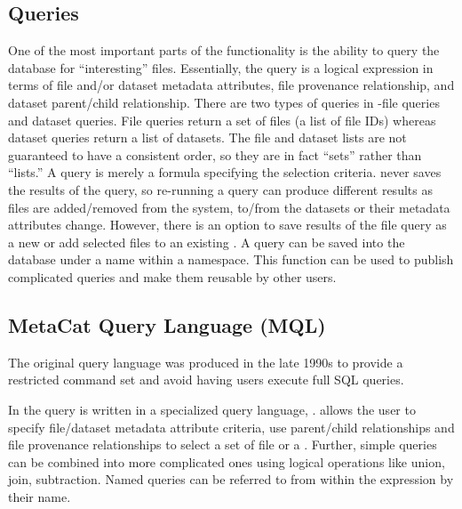 \documentclass[../main-v1.tex]{subfiles}
\begin{document}
\subsection{Queries} 
One of the most important parts of the  functionality is the ability to query the database for ``interesting'' files. Essentially, the query is a logical expression in terms of file and/or dataset metadata attributes, file provenance relationship, and dataset parent/child relationship. There are two types of queries in -file queries and dataset queries. File queries return a set of files (a list of file IDs) whereas dataset queries return a list of datasets. The file and dataset lists are not guaranteed to have a consistent order, so they are in fact ``sets'' rather than ``lists.'' 
A query is merely a formula specifying the selection criteria.  never saves the results of the query, so re-running a query can produce different results as files are  added/removed from the system, to/from the datasets or their metadata attributes change.
However, there is an option to save results of the file query as a new  or add selected files to an existing . 
A query can be saved into the database under a name within a namespace. This function can be used to publish complicated queries and make them reusable by other users. 

\subsection{MetaCat Query Language (MQL)}
The original  query language was produced in the late 1990s to provide a restricted command set and  avoid having users execute full SQL queries.

In   the query is written in a specialized query language, .  allows the user to specify file/dataset metadata attribute criteria, use  parent/child relationships and file provenance relationships to select a set of file or a . Further, simple queries can be combined into more complicated ones using logical operations like union, join, subtraction. Named queries can be referred to from within the  expression by their name. 
\end{document}
